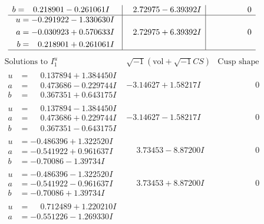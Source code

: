 \documentclass[1p]{elsarticle_modified}
\theoremstyle{definition}
\newcommand{\I}{\sqrt{-1}}
\begin{document}
$$\begin{array}{c|c|c}
\begin{aligned}
b &= \phantom{-}0.218901 - 0.261061 I\end{aligned}
 & \phantom{-}2.72975 - 6.39392 I & \phantom{-0.000000 } 0 \\ \hline\begin{aligned}
u &= -0.291922 - 1.330630 I \\
a &= -0.030923 + 0.570633 I \\
b &= \phantom{-}0.218901 + 0.261061 I\end{aligned}
 & \phantom{-}2.72975 + 6.39392 I & \phantom{-0.000000 } 0\\
 \hline 
 \end{array}$$\newpage$$\begin{array}{c|c|c}  
\text{Solutions to }I^u_{1}& \I (\text{vol} + \sqrt{-1}CS) & \text{Cusp shape}\\
 \hline 
\begin{aligned}
u &= \phantom{-}0.137894 + 1.384450 I \\
a &= \phantom{-}0.473686 - 0.229744 I \\
b &= \phantom{-}0.367351 + 0.643175 I\end{aligned}
 & -3.14627 + 1.58217 I & \phantom{-0.000000 } 0 \\ \hline\begin{aligned}
u &= \phantom{-}0.137894 - 1.384450 I \\
a &= \phantom{-}0.473686 + 0.229744 I \\
b &= \phantom{-}0.367351 - 0.643175 I\end{aligned}
 & -3.14627 - 1.58217 I & \phantom{-0.000000 } 0 \\ \hline\begin{aligned}
u &= -0.486396 + 1.322520 I \\
a &= -0.541922 + 0.961637 I \\
b &= -0.70086 - 1.39734 I\end{aligned}
 & \phantom{-}3.73453 - 8.87200 I & \phantom{-0.000000 } 0 \\ \hline\begin{aligned}
u &= -0.486396 - 1.322520 I \\
a &= -0.541922 - 0.961637 I \\
b &= -0.70086 + 1.39734 I\end{aligned}
 & \phantom{-}3.73453 + 8.87200 I & \phantom{-0.000000 } 0 \\ \hline\begin{aligned}
u &= \phantom{-}0.712489 + 1.220210 I \\
a &= -0.551226 - 1.269330 I \\

\end{aligned}
\end{array}$$
\end{document}
